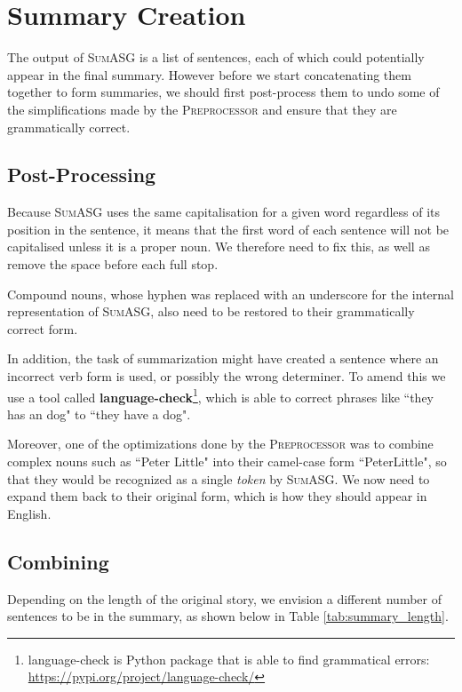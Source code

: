 \section{Summary Creation}
\label{sec:summary_creation}

The output of \textsc{SumASG} is a list of sentences, each of which could potentially appear in the final summary. However before we start concatenating them together to form summaries, we should first post-process them to undo some of the simplifications made by the \textsc{Preprocessor} and ensure that they are grammatically correct.

\subsection{Post-Processing}

Because \textsc{SumASG} uses the same capitalisation for a given word regardless of its position in the sentence, it means that the first word of each sentence will not be capitalised unless it is a proper noun. We therefore need to fix this, as well as remove the space before each full stop.

Compound nouns, whose hyphen was replaced with an underscore for the internal representation of \textsc{SumASG}, also need to be restored to their grammatically correct form.

In addition, the task of summarization might have created a sentence where an incorrect verb form is used, or possibly the wrong determiner. To amend this we use a tool called \textbf{language-check}\footnote{language-check is Python package that is able to find grammatical errors: \url{https://pypi.org/project/language-check/}}, which is able to correct phrases like ``they has an dog" to ``they have a dog".

Moreover, one of the optimizations done by the \textsc{Preprocessor} was to combine complex nouns such as ``Peter Little" into their camel-case form ``PeterLittle", so that they would be recognized as a single \textit{token} by \textsc{SumASG}. We now need to expand them back to their original form, which is how they should appear in English.

\subsection{Combining}

Depending on the length of the original story, we envision a different number of sentences to be in the summary, as shown below in Table \ref{tab:summary_length}.

